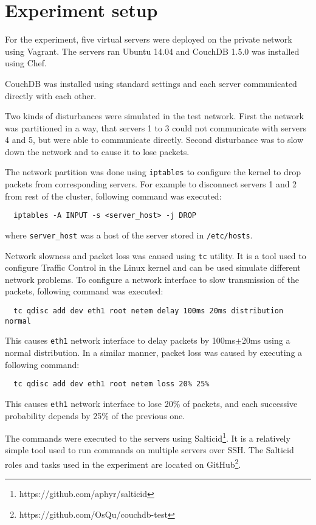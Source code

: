 \section{Experiment setup}


For the experiment, five virtual servers were deployed on the private network
using Vagrant. The servers ran Ubuntu 14.04 and CouchDB 1.5.0 was installed
using Chef.

CouchDB was installed using standard settings and each server communicated
directly with each other.

Two kinds of disturbances were simulated in the test network. First the network
was partitioned in a way, that servers 1 to 3 could not communicate with servers
4 and 5, but were able to communicate directly. Second disturbance was to slow
down the network and to cause it to lose packets.

The network partition was done using \texttt{iptables} to configure the kernel
to drop packets from corresponding servers. For example to disconnect servers 1
and 2 from rest of the cluster, following command was executed:

\begin{verbatim}
  iptables -A INPUT -s <server_host> -j DROP
\end{verbatim}

where \texttt{server\_host} was a host of the server stored in
\texttt{/etc/hosts}.

Network slowness and packet loss was caused using \texttt{tc} utility. It is a
tool used to configure Traffic Control in the Linux kernel and can be used
simulate different network problems. To configure a network interface to slow
transmission of the packets, following command was executed:

\begin{verbatim}
  tc qdisc add dev eth1 root netem delay 100ms 20ms distribution normal
\end{verbatim}

This causes \texttt{eth1} network interface to delay packets by 100ms\(\pm\)20ms
using a normal distribution. In a similar manner, packet loss was caused by
executing a following command:

\begin{verbatim}
  tc qdisc add dev eth1 root netem loss 20% 25%
\end{verbatim}

This causes \texttt{eth1} network interface to lose 20\% of packets, and each
successive probability depends by 25\% of the previous one.

The commands were executed to the servers using
Salticid\footnote{https://github.com/aphyr/salticid}. It is a relatively simple
tool used to run commands on multiple servers over SSH\@. The Salticid roles and
tasks used in the experiment are located on
GitHub\footnote{https://github.com/OsQu/couchdb-test}.
